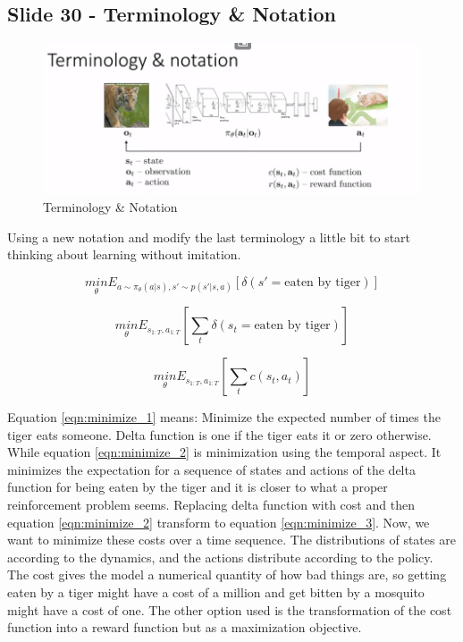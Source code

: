 \documentclass[]{article}
\begin{document}
\subsection*{Slide 30 - Terminology \& Notation}%
\label{sub:Slide 30 - Terminology_Notation}
\begin{figure}
\begin{center}
    \includegraphics[scale=0.4]{cap2img/slide30.png}
\end{center}
\caption{Terminology \& Notation}
\label{fig:term}
\end{figure}


\par Using a new notation and modify the last terminology a little bit to start thinking about learning without
imitation. 

\begin{equation}\label{eqn:minimize_1}
    \underset{\theta}{min} E_{a \sim \pi_{\theta}(a|s),s'\sim p(s'|s,a)}[\delta(s' = \text{eaten by tiger})] 
\end{equation}

\begin{equation}\label{eqn:minimize_2}
    \underset{\theta}{min}E_{s_{1:T},a_{1:T}}[\sum_{t} \delta(s_{t} = \text{eaten by tiger})]
\end{equation}

\begin{equation}\label{eqn:minimize_3}
    \underset{\theta}{min}E_{s_{1:T},a_{1:T}}[\sum_{t}c(s_{t},a_{t})]
\end{equation}

Equation \eqref{eqn:minimize_1} means: Minimize the expected number of times the tiger eats someone. Delta
function is one if the tiger eats it or zero otherwise. While equation \eqref{eqn:minimize_2} is minimization
using the temporal aspect.  It minimizes the expectation for a sequence of states and actions of the delta function for
being eaten by the tiger and it is closer to what a proper reinforcement problem seems. Replacing delta function
with cost and then equation \eqref{eqn:minimize_2} transform to equation \eqref{eqn:minimize_3}. Now, we want to minimize these costs over a time
sequence. The distributions of states are according to the dynamics, and the actions distribute according to the policy. The cost gives the model a numerical
quantity of how bad things are, so getting eaten by a tiger might have a cost of a million and get bitten by a mosquito might have a cost of one. The other
option used is the transformation of the cost function into a reward function but as a maximization objective. 
\end{document}
